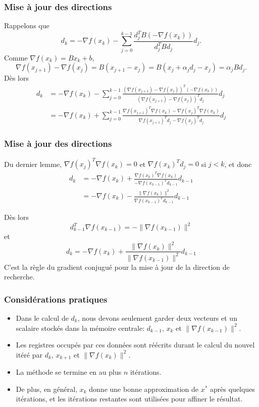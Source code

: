 \documentclass[usepdftitle=false,aspectratio=169]{beamer}
\def\blue{\color{blue}}
\begin{document}
\begin{frame}
\frametitle{Mise à jour des directions}

Rappelons que
$$
d_k = -\nabla f(x_k) - \sum_{j = 0}^{k-1} \frac{d_j^TB(-\nabla f(x_k))}{d_j^TBd_j} d_j.
$$
Comme $\nabla f(x_k) = B x_k + b$,
$$
\nabla f(x_{j+1}) - \nabla f(x_j)
= B (x_{j+1} - x_j)
= B (x_j + \alpha_j d_j - x_j)
= \alpha_j B d_j.
$$
Dès lors
\begin{align*}
d_k
&= -\nabla f(x_k) - \sum_{j = 0}^{k-1} \frac{(\nabla f(x_{j+1}) - \nabla f(x_j))^T(-\nabla f(x_k))}{(\nabla f(x_{j+1}) - \nabla f(x_j))^Td_j} d_j \\
&= -\nabla f(x_k) + \sum_{j = 0}^{k-1} \frac{\nabla f(x_{j+1})^T\nabla f(x_k) - \nabla f(x_j)^T\nabla f(x_k)}{\nabla f(x_{j+1})^Td_j - \nabla f(x_j)^Td_j} d_j
\end{align*}

\end{frame}

\begin{frame}
\frametitle{Mise à jour des directions}

Du dernier lemme, $\nabla f(x_j)^T \nabla f(x_k) = 0$ et $\nabla f(x_k)^T d_j = 0$ si $j < k$, et donc
\begin{align*}
d_k
&= -\nabla f(x_k) + \frac{\nabla f(x_k)^T\nabla f(x_k)}{-\nabla f(x_{k-1})^Td_{k-1}} d_{k-1} \\
&= -\nabla f(x_k) - \frac{\| \nabla f(x_k) \|^2}{\nabla f(x_{k-1})^Td_{k-1}} d_{k-1}
\end{align*}

Dès lors
$$
d_{k-1}^T\nabla f(x_{k-1})
= - \| \nabla f(x_{k-1}) \|^2
$$
et
$$
d_k = -\nabla f(x_k) + \frac{\| \nabla f(x_k) \|^2}{\| \nabla f(x_{k-1}) \|^2} d_{k-1}
$$
C'est la règle du {\blue gradient conjugué} pour la mise à jour de la direction de recherche.

\end{frame}

\begin{frame}
\frametitle{Considérations pratiques}

\begin{itemize}
\item
Dans le calcul de $d_k$, nous devons seulement garder deux vecteurs et un scalaire stockés dans la mémoire centrale: $d_{k-1}$, $x_k$ et $\| \nabla f(x_{k-1}) \|^2$.
\item
Les registres occupés par ces données sont réécrits durant le calcul du nouvel itéré par
$d_k$, $x_{k+1}$ et $\| \nabla f(x_k) \|^2$.
\item
La méthode se termine en au plus $n$ itérations.
\item
De plus, en général, $x_k$ donne une bonne approximation de $x^*$ après quelques itérations, et les itérations restantes sont utilisées pour affiner le résultat.
\end{itemize}

\end{frame}
\end{document}
